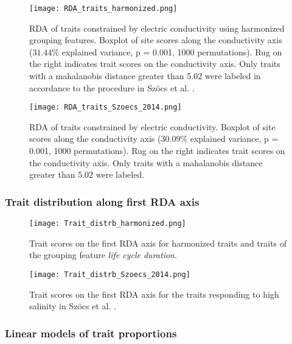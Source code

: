 \documentclass[../Draft_harmonization_paper.tex]{subfiles}
\begin{document}
\begin{figure}[H]
    \centering
    \texttt{[image: RDA\_traits\_harmonized.png]}
    \caption{RDA of traits constrained by electric conductivity using harmonized grouping features. Boxplot of site scores along the conductivity axis ($31.44 \%$ explained variance, p = 0.001, 1000 permutations). Rug on the right indicates trait scores on the conductivity axis. Only traits with a mahalanobis distance greater than 5.02 were labeled in accordance to the procedure in Szöcs et al. \cite{szocs_effects_2014}.
    } 
\end{figure}

\begin{figure}[H]
    \centering
    \texttt{[image: RDA\_traits\_Szoecs\_2014.png]}
    \caption{RDA of traits constrained by electric conductivity. Boxplot of site scores along the conductivity axis ($30.09 \%$ explained variance, p = 0.001, 1000 permutations). Rug on the right indicates trait scores on the conductivity axis. Only traits with a mahalanobis distance greater than 5.02 were labeled.
    } 
\end{figure}

\subsubsection*{Trait distribution along first RDA axis} 


\begin{figure}[H]
    \centering
    \texttt{[image: Trait\_distrb\_harmonized.png]}
    \caption{Trait scores on the first RDA axis for harmonized traits and traits of the grouping feature \textit{life cycle duration}.
    } 
\end{figure}

\begin{figure}[H]
    \centering
    \texttt{[image: Trait\_distrb\_Szoecs\_2014.png]}
    \caption{Trait scores on the first RDA axis for the traits responding to high salinity in Szöcs et al. \cite{szocs_effects_2014}
    .
    }
\end{figure}

\newpage
\subsubsection*{Linear models of trait proportions}
\end{document}
